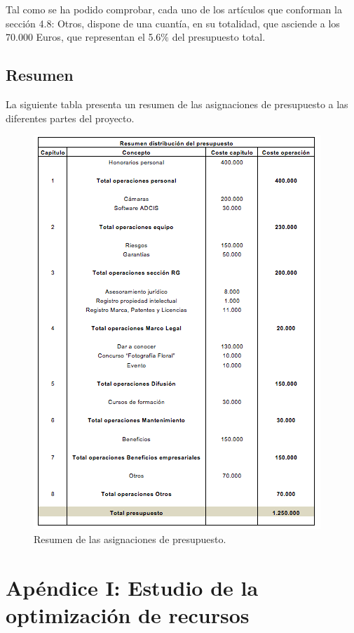 \documentclass[12pt,oneside,a4paper]{article}
\numberwithin{figure}{section}
\begin{document}
Tal como se ha podido comprobar, cada uno de los artículos que conforman la sección 4.8: Otros, dispone de una cuantía, en su totalidad,  que asciende a los 70.000 Euros, que representan el 5.6$\%$ del presupuesto total.

\subsection{Resumen}

La siguiente tabla presenta un resumen de las asignaciones  de presupuesto a las diferentes partes del proyecto.

\begin{figure}[H]
\begin{center}
\includegraphics[scale=1]{Presupuesto10.png}
\caption{Resumen de las asignaciones de presupuesto.}
\end{center}
\end{figure}

\clearpage


\section{Apéndice I: Estudio de la optimización de recursos}
\end{document}
